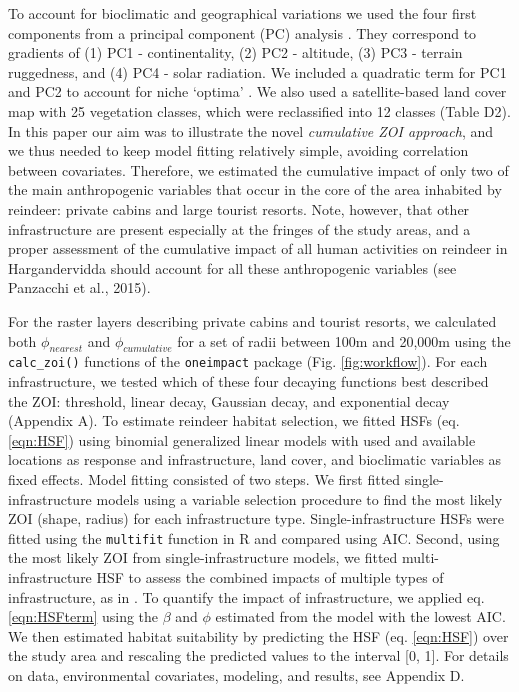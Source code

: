 \documentclass[titlepage]{article}
\begin{document}
To account for bioclimatic and geographical variations we used the four first components from a principal component (PC) analysis \citep{bakkestuen_step-less_2008}. They correspond to gradients of (1) PC1 - continentality, (2) PC2 - altitude, (3) PC3 - terrain ruggedness, and (4) PC4 - solar radiation. We included a quadratic term for PC1 and PC2 to account for niche `optima' \citep[\textit{sensu}][]{panzacchi_searching_2015}. We also used a satellite-based land cover map with 25 vegetation classes, which were reclassified into 12 classes (Table D2). In this paper our aim was to illustrate the novel \textit{cumulative ZOI approach}, and we thus needed to keep model fitting relatively simple, avoiding correlation between covariates. Therefore, we estimated the cumulative impact of only two of the main anthropogenic variables that occur in the core of the area inhabited by reindeer: private cabins and large tourist resorts. Note, however, that other infrastructure are present especially at the fringes of the study areas, and a proper assessment of the cumulative impact of all human activities on reindeer in Hargandervidda should account for all these anthropogenic variables (see Panzacchi et al., 2015).

For the raster layers describing private cabins and tourist resorts, we calculated both  $\phi_{nearest}$ and $\phi_{cumulative}$ for a set of radii between 100m and 20,000m using the \verb|calc_zoi()| functions of the \verb|oneimpact| package (Fig. \ref{fig:workflow}). For each infrastructure, we tested which of these four decaying functions best described the ZOI: threshold, linear decay, Gaussian decay, and exponential decay (Appendix A). To estimate reindeer habitat selection, we fitted HSFs (eq. \ref{eqn:HSF}) using binomial generalized linear models \citep{fieberg_how_2021} with used and available locations as response and infrastructure, land cover, and bioclimatic variables as fixed effects. Model fitting consisted of two steps. We first fitted single-infrastructure models using a variable selection procedure \citep{burnham_model_2002} to find the most likely ZOI (shape, radius) for each infrastructure type. Single-infrastructure HSFs were fitted using the \verb|multifit| function in R \citep{huais_multifit_2018} and compared using AIC. Second, using the most likely ZOI from single-infrastructure models, we fitted multi-infrastructure HSF to assess the combined impacts of multiple types of infrastructure, as in \citet{laforge_process-focussed_2015}. To quantify the impact of infrastructure, we applied eq. \ref{eqn:HSFterm} using the $\beta$ and $\phi$ estimated from the model with the lowest AIC. We then estimated habitat suitability by predicting the HSF (eq. \ref{eqn:HSF}) over the study area and rescaling the predicted values to the interval [0, 1]. For details on data, environmental covariates, modeling, and results, see Appendix D.
\end{document}
